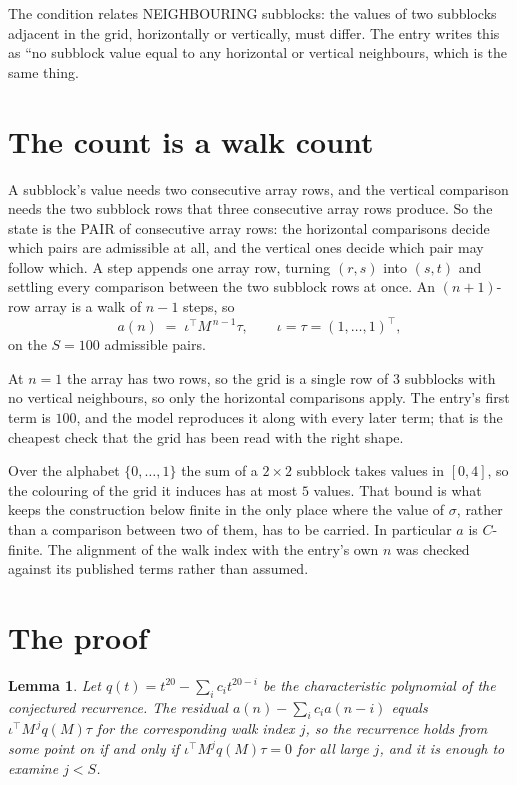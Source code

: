 \documentclass[11pt,a4paper]{article}
\theoremstyle{plain}
\newtheorem{lemma}[theorem]{Lemma}
\theoremstyle{definition}
\begin{document}
The condition relates NEIGHBOURING subblocks: the values of two subblocks adjacent in the grid,
horizontally or vertically, must differ. The entry writes this as ``no subblock value equal to any horizontal or vertical neighbours, which is the same thing.

\section{The count is a walk count}

A subblock's value needs two consecutive array rows, and the vertical
comparison needs the two subblock rows that three consecutive array rows produce. So the state
is the PAIR of consecutive array rows: the horizontal comparisons decide which pairs are
admissible at all, and the vertical ones decide which pair may follow which. A step appends one
array row, turning $(r,s)$ into $(s,t)$ and settling every comparison between the two subblock
rows at once. An $(n+1)$-row array is a walk of $n-1$ steps, so
\[
a(n)\;=\;\iota^{\!\top}M^{\,n-1}\tau,\qquad\iota=\tau=(1,\dots,1)^{\!\top},
\]
on the $S=100$ admissible pairs.

At $n=1$ the array has two rows, so the grid is a single row of $3$
subblocks with no vertical neighbours, so only the horizontal comparisons apply. The
entry's first term is $100$, and the model reproduces it along with every later term; that
is the cheapest check that the grid has been read with the right shape.

Over the alphabet $\{0,\dots,1\}$ the sum of a $2\times2$ subblock takes values in
$[0,4]$, so the colouring of the grid it induces has at most $5$ values.
That bound is what keeps the construction below finite in the only place where the value of
$\sigma$, rather than a comparison between two of them, has to be carried.
In particular $a$ is $C$-finite. The alignment of the walk index with the entry's own $n$ was
checked against its published terms rather than assumed.

\section{The proof}

\begin{lemma}\label{lem:crit}
Let $q(t)=t^{20}-\sum_i c_it^{20-i}$ be the characteristic polynomial of the
conjectured recurrence. The residual $a(n)-\sum_ic_ia(n-i)$ equals
$\iota^{\!\top}M^{\,j}q(M)\tau$ for the corresponding walk index $j$, so the recurrence
holds from some point on if and only if $\iota^{\!\top}M^{j}q(M)\tau=0$ for all large $j$,
and it is enough to examine $j<S$.
\end{lemma}
\end{document}
